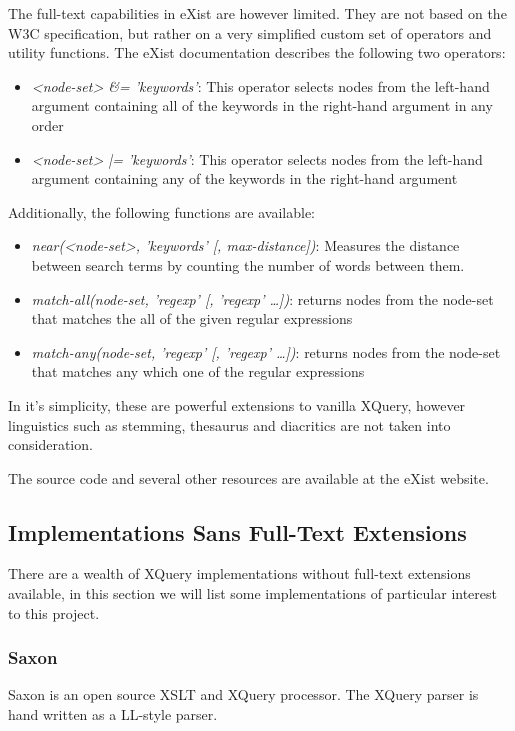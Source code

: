 The full-text capabilities in eXist are however limited. They are not based on
the W3C specification, but rather on a very simplified custom set of operators
and utility functions. The eXist documentation\cite{exist_doc} describes the
following two operators:

\begin{itemize}
  \item \emph{<node-set> \&= 'keywords'}: This operator selects nodes from the
  left-hand argument containing all of the keywords in the right-hand argument 
  in any order
  \item \emph{<node-set> |= 'keywords'}: This operator selects nodes from the
  left-hand argument containing any of the keywords in the right-hand argument
\end{itemize}

Additionally, the following functions are available:
\begin{itemize}
  \item \emph{near(<node-set>, 'keywords' [, max-distance])}: Measures the 
  distance between search terms by counting the number of words between 
  them.
  \item \emph{match-all(node-set, 'regexp' [, 'regexp' \ldots])}: returns
  nodes from the node-set that matches the all of the given regular expressions 
  \item \emph{match-any(node-set, 'regexp' [, 'regexp' \ldots])}: returns nodes
  from the node-set that matches any which one of the regular expressions
\end{itemize}

In it's simplicity, these are powerful extensions to vanilla XQuery, however
linguistics such as stemming, thesaurus and diacritics are not taken into
consideration.

The source code and several other resources are available at the eXist
website\cite{existweb}. 

\subsection{Implementations Sans Full-Text Extensions}
There are a wealth of XQuery implementations without full-text
extensions available, in this section we will list some implementations of
particular interest to this project.

\subsubsection{Saxon}
Saxon is an open source XSLT and XQuery processor. The XQuery parser is hand
written as a LL-style parser.

